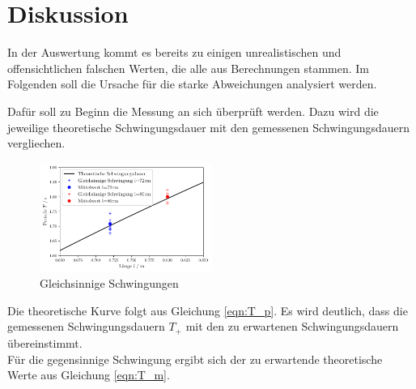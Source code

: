\section{Diskussion}
\label{sec:Diskussion}

In der Auswertung kommt es bereits zu einigen unrealistischen und offensichtlichen
falschen Werten, die alle aus Berechnungen stammen.
Im Folgenden soll die Ursache für die starke Abweichungen analysiert werden.


Dafür soll zu Beginn die Messung an sich überprüft werden.
Dazu wird die jeweilige theoretische Schwingungsdauer mit den gemessenen Schwingungsdauern vergliechen.
\begin{figure}
    \centering
    \includegraphics[width=0.5\textwidth]{plots/plot1.pdf}
    \caption{Gleichsinnige Schwingungen}
\end{figure}
Die theoretische Kurve folgt aus Gleichung \ref{eqn:T_p}. Es wird deutlich, dass die gemessenen
Schwingungsdauern $T_+$ mit den zu erwartenen Schwingungsdauern übereinstimmt.\\

Für die gegensinnige Schwingung ergibt sich der zu erwartende theoretische Werte aus Gleichung \ref{eqn:T_m}.

